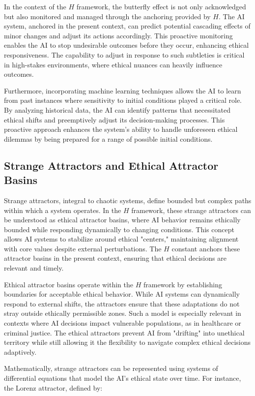 \documentclass[12pt]{article}
\begin{document}
In the context of the \(H\) framework, the butterfly effect is not only acknowledged but also monitored and managed through the anchoring provided by \(H\). The AI system, anchored in the present context, can predict potential cascading effects of minor changes and adjust its actions accordingly. This proactive monitoring enables the AI to stop undesirable outcomes before they occur, enhancing ethical responsiveness. The capability to adjust in response to such subtleties is critical in high-stakes environments, where ethical nuances can heavily influence outcomes.

Furthermore, incorporating machine learning techniques allows the AI to learn from past instances where sensitivity to initial conditions played a critical role. By analyzing historical data, the AI can identify patterns that necessitated ethical shifts and preemptively adjust its decision-making processes. This proactive approach enhances the system's ability to handle unforeseen ethical dilemmas by being prepared for a range of possible initial conditions.

\subsection{Strange Attractors and Ethical Attractor Basins}
Strange attractors, integral to chaotic systems, define bounded but complex paths within which a system operates. In the \(H\) framework, these strange attractors can be understood as ethical attractor basins, where AI behavior remains ethically bounded while responding dynamically to changing conditions. This concept allows AI systems to stabilize around ethical "centers," maintaining alignment with core values despite external perturbations. The \(H\) constant anchors these attractor basins in the present context, ensuring that ethical decisions are relevant and timely.

Ethical attractor basins operate within the \(H\) framework by establishing boundaries for acceptable ethical behavior. While AI systems can dynamically respond to external shifts, the attractors ensure that these adaptations do not stray outside ethically permissible zones. Such a model is especially relevant in contexts where AI decisions impact vulnerable populations, as in healthcare or criminal justice. The ethical attractors prevent AI from "drifting" into unethical territory while still allowing it the flexibility to navigate complex ethical decisions adaptively.

Mathematically, strange attractors can be represented using systems of differential equations that model the AI's ethical state over time. For instance, the Lorenz attractor, defined by:
\end{document}
